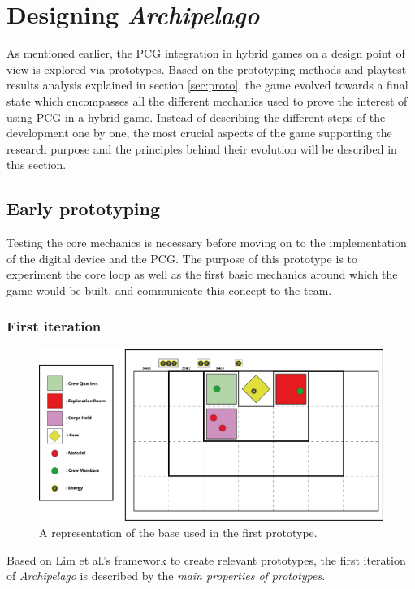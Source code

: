 \section{Designing \textit{Archipelago}}
As mentioned earlier, the PCG integration in hybrid games on a design point of view is explored via prototypes. Based on the prototyping methods and playtest results analysis explained in section \ref{sec:proto}, the game evolved towards a final state which encompasses all the different mechanics used to prove the interest of using PCG in a hybrid game. Instead of describing the different steps of the development one by one, the most crucial aspects of the game supporting the research purpose and the principles behind their evolution will be described in this section.  
\subsection{Early prototyping}
Testing the core mechanics is necessary before moving on to the implementation of the digital device and the PCG. The purpose of this prototype is to experiment the core loop as well as the first basic mechanics around which the game would be built, and communicate this concept to the team.
\subsubsection{First iteration}
\begin{figure}[h]
    \centering
    \includegraphics[scale=0.5]{Images/Board1.png}
    \caption{A representation of the base used in the first prototype.}
    \label{fig:base1}
\end{figure}
Based on Lim et al.'s framework to create relevant prototypes, the first iteration of \textit{Archipelago} is described by the \textit{main properties of prototypes}.

